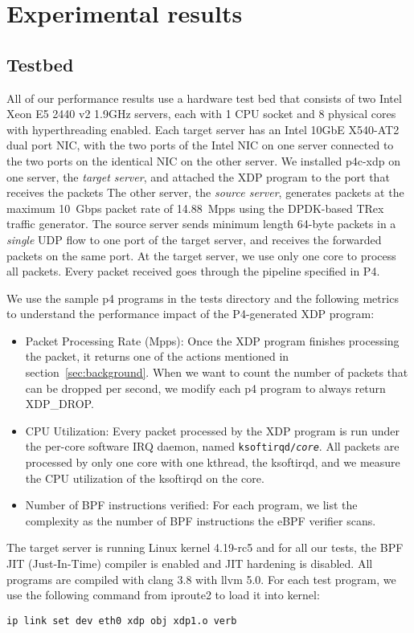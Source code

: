 \section{Experimental results}\label{sec:results}
\subsection{Testbed}
All of our performance results use a hardware test bed that consists of
two Intel Xeon E5 2440 v2 1.9GHz servers, each with 1 CPU socket and
8 physical cores with hyperthreading enabled.
Each target server has an Intel 10GbE X540-AT2 dual
port NIC, with the two ports of the Intel NIC on one server connected
to the two ports on the identical NIC on the other server.
We installed p4c-xdp on one server, the {\em target server}, and
attached the XDP program to the port that receives the packets
The other server, the {\em source server}, generates packets
at the maximum 10~Gbps packet rate of 14.88~Mpps using the DPDK-based
TRex~\cite{trex} traffic generator.  The source server sends minimum
length 64-byte packets in a {\em single} UDP flow to one port of the
target server, and receives the forwarded packets on the same port.
At the target server, we use only one core to process all packets.
Every packet received goes through the pipeline specified in P4.

We use the sample p4 programs in the tests directory and the following
metrics to understand the performance impact of the P4-generated XDP
program:
\begin{itemize}
\item Packet Processing Rate (Mpps): Once the XDP program finishes
  processing the packet, it returns one of the actions mentioned in
  section~\ref{sec:background}.  When we want to count the number of
  packets that can be dropped per second, we modify each p4 program to
  always return XDP\_DROP.
\item CPU Utilization: Every packet processed by the XDP program is run
  under the per-core software IRQ daemon, named
  \texttt{ksoftirqd/\textit{core}}.  All packets are processed by only
  one core with one kthread, the ksoftirqd, and we measure the CPU
  utilization of the ksoftirqd on the core.
\item Number of BPF instructions verified: For each program, we list
  the complexity as the number of BPF instructions the eBPF
  verifier scans.
\end{itemize}

The target server is running Linux kernel 4.19-rc5 and for all our
tests, the BPF JIT (Just-In-Time) compiler is enabled and JIT hardening
is disabled. All programs are compiled with clang 3.8 with llvm 5.0.
For each test program, we use the following
command from iproute2 to load it into kernel:
\begin{lstlisting}[frame=none]
ip link set dev eth0 xdp obj xdp1.o verb
\end{lstlisting}

